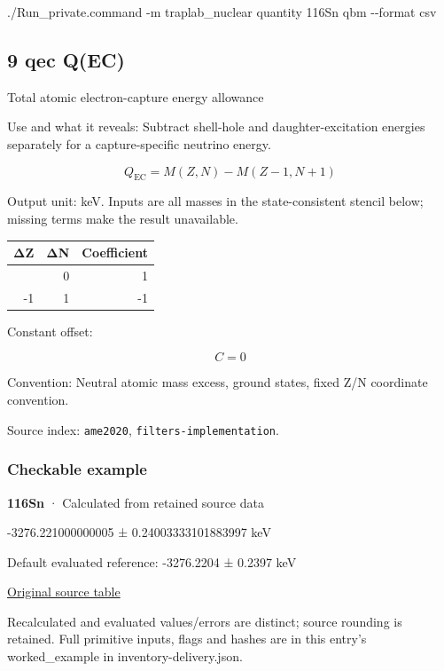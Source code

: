 \documentclass[
  11pt,
  letterpaper,
]{article}
\newenvironment{Shaded}{}{}
\newcommand{\AttributeTok}[1]{\textcolor[rgb]{0.49,0.56,0.16}{#1}}
\newcommand{\ExtensionTok}[1]{#1}
\newcommand{\NormalTok}[1]{#1}
\begin{document}
\begin{Shaded}
\begin{Highlighting}[]
\ExtensionTok{./Run\_private.command} \AttributeTok{{-}m}\NormalTok{ traplab\_nuclear quantity 116Sn qbm }\AttributeTok{{-}{-}format}\NormalTok{ csv}
\end{Highlighting}
\end{Shaded}

\subsection{9 qec Q(EC)}\label{qec-qec}

Total atomic electron-capture energy allowance

Use and what it reveals: Subtract shell-hole and daughter-excitation
energies separately for a capture-specific neutrino energy.

\[
Q_{\mathrm{EC}}=M(Z,N)-M(Z-1,N+1)
\]

Output unit: keV. Inputs are all masses in the state-consistent stencil
below; missing terms make the result unavailable.

\begin{longtable}[]{@{}rrr@{}}
\toprule\noalign{}
ΔZ & ΔN & Coefficient \\
\midrule\noalign{}
\endhead
\bottomrule\noalign{}
\endlastfoot
0 & 0 & 1 \\
-1 & 1 & -1 \\
\end{longtable}

Constant offset:

\[
C=0
\]

Convention: Neutral atomic mass excess, ground states, fixed Z/N
coordinate convention.

Source index: \texttt{ame2020}, \texttt{filters-implementation}.

\subsubsection{Checkable example}\label{checkable-example-8}

\textbf{116Sn} · Calculated from retained source data

-3276.221000000005 ± 0.24003333101883997 keV

Default evaluated reference: -3276.2204 ± 0.2397 keV

\href{https://www-nds.iaea.org/amdc/ame2020/mass_1.mas20.txt}{Original
source table}

Recalculated and evaluated values/errors are distinct; source rounding
is retained. Full primitive inputs, flags and hashes are in this entry's
worked\_example in inventory-delivery.json.
\end{document}
